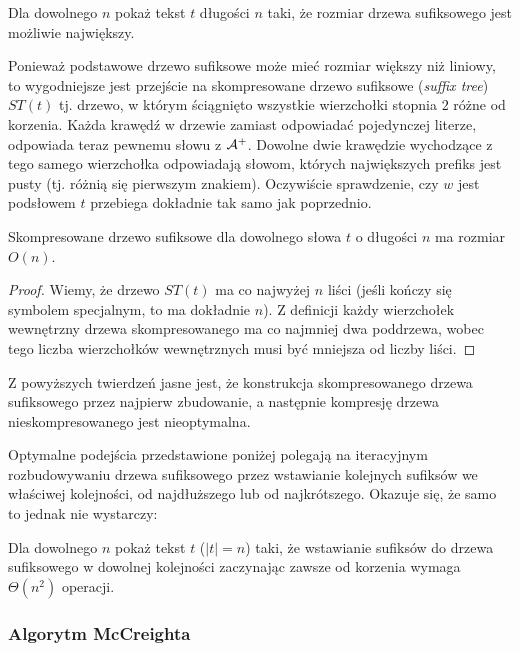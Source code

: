 \begin{problem}{}{}
  Dla dowolnego $n$ pokaż tekst $t$ długości $n$ taki, że rozmiar drzewa sufiksowego jest możliwie największy.
\end{problem}


Ponieważ podstawowe drzewo sufiksowe może mieć rozmiar większy niż liniowy, to wygodniejsze jest przejście na skompresowane drzewo sufiksowe (\emph{suffix tree}) $ST(t)$ tj. drzewo, w którym ściągnięto wszystkie wierzchołki stopnia $2$ różne od korzenia. Każda krawędź w drzewie zamiast odpowiadać pojedynczej literze, odpowiada teraz pewnemu słowu z $\mathcal{A}^+$. Dowolne dwie krawędzie wychodzące z tego samego wierzchołka odpowiadają słowom, których największych prefiks jest pusty (tj. różnią się pierwszym znakiem).
Oczywiście sprawdzenie, czy $w$ jest podsłowem $t$ przebiega dokładnie tak samo jak poprzednio.

\begin{theorem}{}{}
  Skompresowane drzewo sufiksowe dla dowolnego słowa $t$ o długości $n$ ma rozmiar $O(n)$.
\end{theorem}

\begin{proof}
  Wiemy, że drzewo $ST(t)$ ma co najwyżej $n$ liści (jeśli kończy się symbolem specjalnym, to ma dokładnie $n$). Z definicji każdy wierzchołek wewnętrzny drzewa skompresowanego ma co najmniej dwa poddrzewa, wobec tego liczba wierzchołków wewnętrznych musi być mniejsza od liczby liści.
\end{proof}

Z powyższych twierdzeń jasne jest, że konstrukcja skompresowanego drzewa sufiksowego przez najpierw zbudowanie, a następnie kompresję drzewa nieskompresowanego jest nieoptymalna.


Optymalne podejścia przedstawione poniżej polegają na iteracyjnym rozbudowywaniu drzewa sufiksowego przez wstawianie kolejnych sufiksów we właściwej kolejności, od najdłuższego lub od najkrótszego. Okazuje się, że samo to jednak nie wystarczy:
\begin{problem}{}{}
  Dla dowolnego $n$ pokaż tekst $t$ ($|t| = n$) taki, że wstawianie sufiksów do drzewa sufiksowego w dowolnej kolejności zaczynając zawsze od korzenia wymaga $\Theta(n^2)$ operacji.
\end{problem}

\subsubsection{Algorytm McCreighta}

